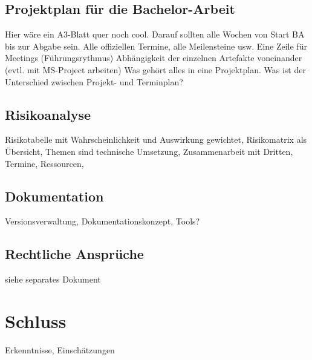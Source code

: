 \documentclass[a4paper,ngerman, 12pt]{report}
\begin{document}
\section{Projektplan für die Bachelor-Arbeit}
Hier wäre ein A3-Blatt quer noch cool. Darauf sollten alle Wochen von Start BA bis zur Abgabe sein.
Alle offiziellen Termine, alle Meilensteine usw.
Eine Zeile für Meetings (Führungsrythmus)
Abhängigkeit der einzelnen Artefakte voneinander (evtl. mit MS-Project arbeiten)
Was gehört alles in eine Projektplan. Was ist der Unterschied zwischen Projekt- und Terminplan?

\section{Risikoanalyse}
   
Risikotabelle mit Wahrscheinlichkeit und Auswirkung gewichtet, Risikomatrix als Übersicht, Themen sind technische Umsetzung, Zusammenarbeit mit Dritten, Termine, Ressourcen, 

\section{Dokumentation}
Versionsverwaltung, Dokumentationskonzept, Tools?

\section{Rechtliche Ansprüche}
siehe separates Dokument


\chapter{Schluss}
Erkenntnisse, Einschätzungen



{}	

\end{document}
